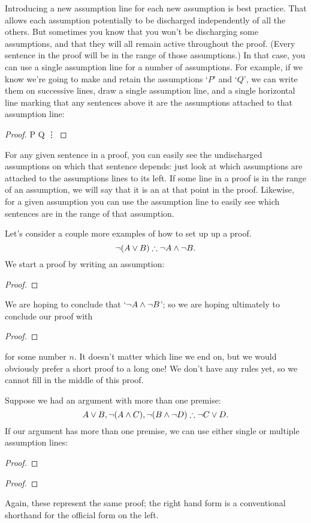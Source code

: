 Introducing a new assumption line for each new assumption is best practice. That allows each assumption potentially to be discharged independently of all the others. But sometimes you know that you won't be discharging some assumptions, and that they will all remain active throughout the proof. (Every sentence in the proof will be in the range of those assumptions.) In that case, you can use a single assumption line for a number of assumptions. For example, if we know we're going to make and retain the assumptions `$P$' and `$Q$', we can write them on successive lines, draw a single assumption line, and a single horizontal line marking that any sentences above it are the assumptions attached to that assumption line: \begin{proof}
	 P
	 Q
	 \vdots
\end{proof}

For any given sentence in a proof, you can easily see the undischarged assumptions on which that sentence depends: just look at which assumptions are attached to the assumptions lines to its left. If some line in a proof is in the range of an assumption, we will say that it is an  at that point in the proof. Likewise, for a given assumption you can use the assumption line to easily see which sentences are in the range of that assumption.

Let's consider a couple more examples of how to set up up a proof.	$$\neg (A \vee B) \mathrel{\therefore} \neg A \wedge \neg B.$$
We start a proof by writing an assumption:
\begin{proof}
\end{proof} We are hoping to conclude that `$\neg A \wedge \neg B$'; so we are hoping ultimately to conclude our proof with
\begin{proof}
\end{proof}
for some number $n$. It doesn't matter which line we end on, but we would obviously prefer a short proof to a long one! We don't have any rules yet, so we cannot fill in the middle of this proof.

Suppose we had an argument with more than one premise:
$$A\vee B, \neg (A\wedge C), \neg (B \wedge \neg D) \mathrel{\therefore} \neg C\vee D.$$
If our argument has more than one premise, we can use either single or multiple assumption lines: \begin{multicols}{2}\noindent
\begin{proof}
	\open{}
	\open{}
\end{proof}

\begin{proof}
\end{proof}
\end{multicols}
Again, these represent the same proof; the right hand form is a conventional shorthand for the official form on the left.


